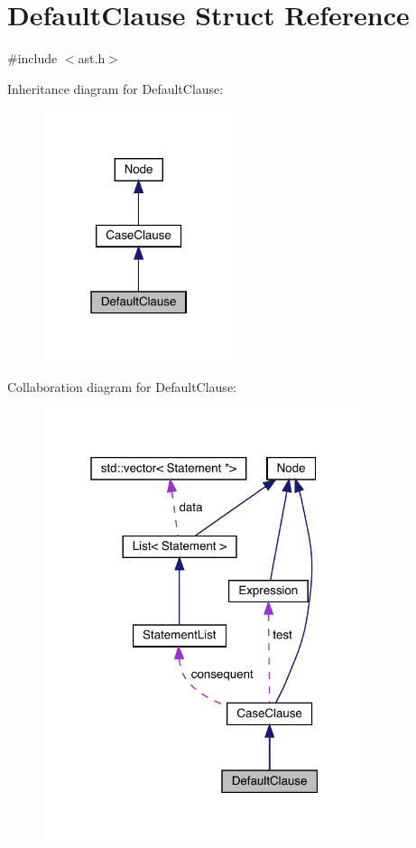 \hypertarget{struct_default_clause}{}\section{Default\+Clause Struct Reference}
\label{struct_default_clause}


{\ttfamily \#include $<$ast.\+h$>$}



Inheritance diagram for Default\+Clause\+:
\nopagebreak
\begin{figure}[H]
\begin{center}
\leavevmode
\includegraphics[width=159pt]{struct_default_clause__inherit__graph}
\end{center}
\end{figure}


Collaboration diagram for Default\+Clause\+:
\nopagebreak
\begin{figure}[H]
\begin{center}
\leavevmode
\includegraphics[width=268pt]{struct_default_clause__coll__graph}
\end{center}
\end{figure}
